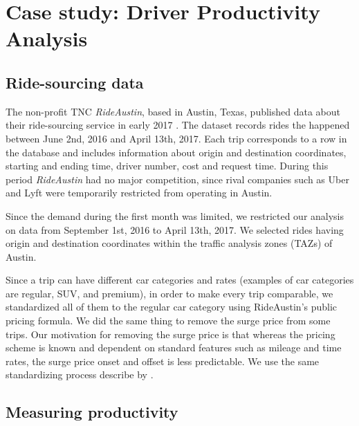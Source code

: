 \documentclass[a4paper, 11pt]{article}
\begin{document}
\section{Case study: Driver Productivity Analysis}
\label{section:case-study}


\subsection{Ride-sourcing data}

The non-profit TNC \textit{RideAustin}, based in Austin, Texas, published data about their ride-sourcing service in early 2017 \citep{dataworld-2017}. The dataset records rides the happened between June 2nd, 2016 and April 13th, 2017. Each trip corresponds to a row in the database and includes information about origin and destination coordinates, starting and ending time, driver number, cost and request time. During this period \textit{RideAustin} had no major competition, since rival companies such as Uber and Lyft were temporarily restricted from operating in Austin.

Since the demand during the first month was limited, we restricted our analysis on data from September 1st, 2016 to April 13th, 2017. We selected rides having origin and destination coordinates within the traffic analysis zones (TAZs) of Austin. 

Since a trip can have different car categories and rates (examples of car categories are regular, SUV, and premium), in order to make every trip comparable, we standardized all of them to the regular car category using RideAustin's public pricing formula. We did the same thing to remove the surge price from some trips. Our motivation for removing the surge price is that whereas the pricing scheme is known and dependent on standard features such as mileage and time rates, the surge price onset and offset is less predictable. We use the same standardizing process describe by \citet{zuniga-etal-2019}.

\subsection{Measuring productivity}\label{subsection:productivity}
\end{document}
